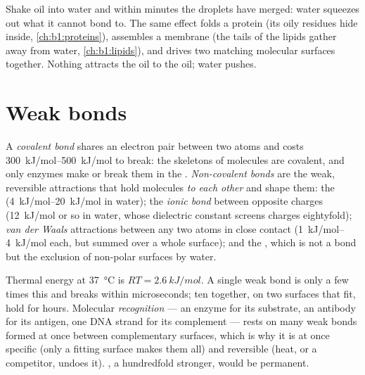 \begin{example}\label{ex:b1:water-small-molecules:hydrophobic}
Shake oil into water and within minutes the droplets have merged: water
squeezes out what it cannot bond to. The same effect folds a protein
(its oily residues hide inside, \cref{ch:b1:proteins}), assembles a
membrane (the tails of the lipids gather away from water,
\cref{ch:b1:lipids}), and drives two matching molecular surfaces
together. Nothing attracts the oil to the oil; water pushes.
\end{example}

\section{Weak bonds}

\begin{definition}\label{def:b1:water-small-molecules:bonds}
A \emph{covalent bond} shares an electron pair
between two atoms and costs \qtyrange{300}{500}{kJ/mol} to break: the
skeletons of molecules are covalent, and only enzymes make or break
them in the . \emph{Non-covalent bonds}
are the weak, reversible attractions that hold molecules \emph{to each
other} and shape them: the \emph{} (\qtyrange{4}{20}{kJ/mol}
in water); the \emph{ionic bond} between opposite
charges (\qty{12}{kJ/mol} or so in water, whose dielectric constant
screens charges eightyfold); \emph{van der Waals} attractions between any two atoms in close contact
(\qtyrange{1}{4}{kJ/mol} each, but summed over a whole surface); and
the \emph{}, which is not a bond but the exclusion of
non-polar surfaces by water.
\end{definition}

\begin{proposition}\label{prop:b1:water-small-molecules:weak}
Thermal energy at \qty{37}{\celsius} is $RT = \qty{2.6}{kJ/mol}$. A
single weak bond is only a few times this and breaks within
microseconds; ten together, on two surfaces that fit, hold for hours.
Molecular \emph{recognition} --- an enzyme
for its substrate, an antibody for its antigen, one DNA strand for its
complement --- rests on many weak bonds formed at once between
complementary surfaces, which is why it is at once specific (only a
fitting surface makes them all) and reversible (heat, or a competitor,
undoes it). , a hundredfold stronger, would be permanent.
\end{proposition}

